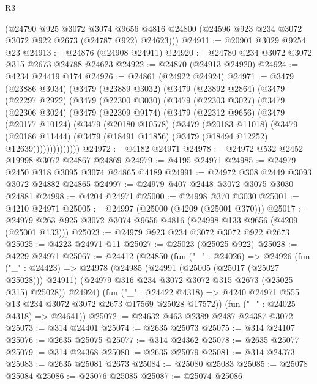 \begin{lexlean}{R3}
\begin{coremodule}
      (@24790
        @925
        @3072
        @3074
        @9656
        @4816
        @24800
        (@24596 @923 @234 @3072 @3072 @922 @2673 (@24787 @922) @24623)))
@24911 := @20901 @3029 @9254 @23
@24913 := @24876 (@24908 @24911)
@24920 := @24780 @234 @3072 @3072 @315 @2673 @24788 @24623
@24922 := @24870 (@24913 @24920)
@24924 := @4234 @24419 @174
@24926 := @24861 (@24922 @24924)
@24971 := @3479
    (@23886 @3034)
    (@3479
      (@23889 @3032)
      (@3479
        (@23892 @2864)
        (@3479
          (@22297 @2922)
          (@3479
            (@22300 @3030)
            (@3479
              (@22303 @3027)
              (@3479
                (@22306 @3024)
                (@3479
                  (@22309 @9174)
                  (@3479
                    (@22312 @9656)
                    (@3479
                      (@20177 @10124)
                      (@3479
                        (@20180 @10578)
                        (@3479
                          (@20183 @11018)
                          (@3479
                            (@20186 @11444)
                            (@3479 (@18491 @11856) (@3479 (@18494 @12252) @12639))))))))))))))
@24972 := @4182 @24971
@24978 := @24972 @532 @2452 @19998 @3072 @24867 @24869
@24979 := @4195 @24971
@24985 := @24979 @2450 @318 @3095 @3074 @24865 @4189
@24991 := @24972 @308 @2449 @3093 @3072 @24882 @24865
@24997 := @24979 @407 @2448 @3072 @3075 @3030 @24881
@24998 := @4204 @24971
@25000 := @24998 @370 @3030
@25001 := @4210 @24971
@25005 := @24997 (@25000 (@4209 (@25001 @370)))
@25017 := @24979 @263 @925 @3072 @3074 @9656 @4816 (@24998 @133 @9656 (@4209 (@25001 @133)))
@25023 := @24979 @923 @234 @3072 @3072 @922 @2673
@25025 := @4223 @24971 @11
@25027 := @25023 (@25025 @922)
@25028 := @4229 @24971
@25067 := @24412
    (@24850
      (fun ("_" : @24026) =>
      @24926
        (fun ("_" : @24423) =>
        @24978
          (@24985
            (@24991 (@25005 (@25017 (@25027 @25028))) @24911)
            (@24979 @316 @234 @3072 @3072 @315 @2673 (@25025 @315) @25028))
          @24924)
        (fun ("_" : @24422 @4318) =>
        @4240 @24971 @555 @13 @234 @3072 @3072 @2673 @17569 @25028 @17572))
      (fun ("_" : @24025 @4318) => @24641))
@25072 := @24632 @463 @2389 @2487 @24387 @3072
@25073 := @314 @24401
@25074 := @2635 @25073
@25075 := @314 @24107
@25076 := @2635 @25075
@25077 := @314 @24362
@25078 := @2635 @25077
@25079 := @314 @24368
@25080 := @2635 @25079
@25081 := @314 @24373
@25083 := @2635 @25081 @2673
@25084 := @25080 @25083
@25085 := @25078 @25084
@25086 := @25076 @25085
@25087 := @25074 @25086

\end{coremodule}
\end{lexlean}

